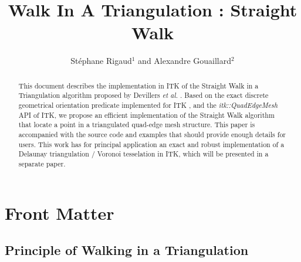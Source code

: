 \documentclass{InsightArticle}
\title{Walk In A Triangulation : Straight Walk}
\author{St\'{e}phane Rigaud$^{1}$ and Alexandre Gouaillard$^{2}$}
\newcommand{\IJhandlerIDnumber}{1338} %
\begin{document}
%
% 
\IJhandlefooter{\IJhandlerIDnumber}


\ifpdf
\else
\fi


\maketitle


\ifhtml
\chapter*{Front Matter\label{front}}
\fi


\begin{abstract}
\noindent
This document describes the implementation in ITK of the Straight Walk in a Triangulation algorithm proposed by Devillers \emph{et al.} \cite{Devillers2001}. Based on the exact discrete geometrical orientation predicate implemented for ITK \cite{Moreau2011}, and the \emph{itk::QuadEdgeMesh} API of ITK, we propose an efficient implementation of the Straight Walk algorithm that locate a point in a triangulated quad-edge mesh structure. This paper is accompanied with the source code and examples that should provide enough details for users.
This work has for principal application an exact and robust implementation of a Delaunay triangulation / Voronoi tesselation in ITK, which will be presented in a separate paper.


\end{abstract}

\IJhandlenote{\IJhandlerIDnumber}

\tableofcontents

\section{Principle of Walking in a Triangulation}
\end{document}
